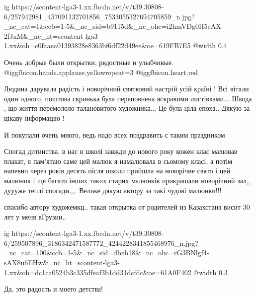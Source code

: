  
 
 
 
 

\ifcmt
  ig https://scontent-lga3-1.xx.fbcdn.net/v/t39.30808-6/257942981_457091132701856_7533055327694705859_n.jpg?_nc_cat=1&ccb=1-5&_nc_sid=b9115d&_nc_ohc=i2hmVDg0H5cAX-2fJxM&_nc_ht=scontent-lga3-1.xx&oh=c0faaea01393828e8363bf6df22d49ee&oe=619FB7E5
  @width 0.4
\fi

Очень добрые были открытки, рвдостные и улыбчивые. @igg{fbicon.hands.applause.yellow}{repeat=3} @igg{fbicon.heart.red}


Людина дарувала радість і новорічний святковий настрій усій країні ! Всі вітали
один одного, поштова скринька була переповнена яскравими листівками... Шкода ,
що життя перемололо талановитого художника... Це була ціла епоха.. Дякую за
цікаву інформацію !

И покупали очень много, ведь надо всех поздравить с таким праздником


Спогад дитинства, в нас в школі завжди до нового року кожен клас малював
плакат, я пам'ятаю саме цей малюк я намалювала в сьомому класі, а потім напевно
через років десять після школи прийшла на новорічне свято і цей малюнок і ще
багато інших таких старих малюнків прикрашали новорічний зал,, дуууже теплі
спогади,,,. Велике дякую автору за такі чудові малюнки!!!



спасибо автору художемкц.. такая открытка от родителей из Казахстана висит 30
лет у меня вГрузии..

\ifcmt
  ig https://scontent-lga3-1.xx.fbcdn.net/v/t39.30808-6/259507896_3186342471587772_4244228341855468976_n.jpg?_nc_cat=100&ccb=1-5&_nc_sid=dbeb18&_nc_ohc=rG3BNlgf4-sAX8u6EHw&_nc_ht=scontent-lga3-1.xx&oh=dc1ca0524b3c335dfeaf3b1dd31dcfdc&oe=61A0F402
  @width 0.3
\fi

Да, это радость и моего детства!

